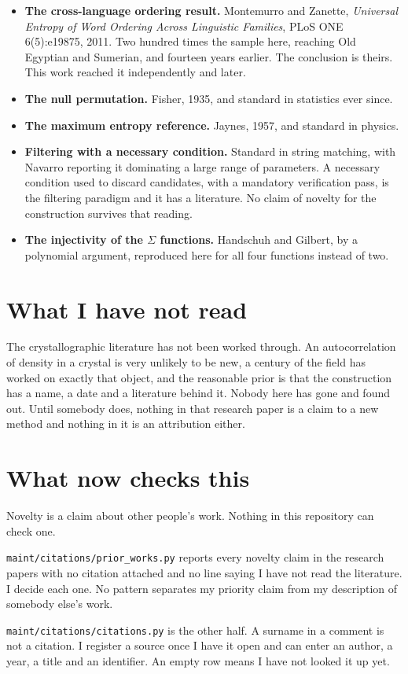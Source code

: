 \begin{itemize}
  \item \textbf{The cross-language ordering result.} Montemurro and Zanette,
    \emph{Universal Entropy of Word Ordering Across Linguistic Families}, PLoS ONE 6(5):e19875, 2011.
    Two hundred times the sample here, reaching Old Egyptian and Sumerian, and fourteen years
    earlier. The conclusion is theirs. This work reached it independently and later.
  \item \textbf{The null permutation.} Fisher, 1935, and standard in statistics ever since.
  \item \textbf{The maximum entropy reference.} Jaynes, 1957, and standard in physics.
  \item \textbf{Filtering with a necessary condition.} Standard in string matching, with Navarro
    reporting it dominating a large range of parameters. A necessary condition used to discard
    candidates, with a mandatory verification pass, is the filtering paradigm and it has a
    literature. No claim of novelty for the construction survives that reading.
  \item \textbf{The injectivity of the $\Sigma$ functions.} Handschuh and Gilbert, by a polynomial
    argument, reproduced here for all four functions instead of two.
\end{itemize}

\section*{What I have not read}

The crystallographic literature has not been worked through. An autocorrelation of density in a
crystal is very unlikely to be new, a century of the field has worked on exactly that object, and
the reasonable prior is that the construction has a name, a date and a literature behind it. Nobody
here has gone and found out. Until somebody does, nothing in that research paper is a claim to a new method
and nothing in it is an attribution either.

\section*{What now checks this}

Novelty is a claim about other people's work. Nothing in this repository can check one.

\texttt{maint/\allowbreak{}citations/\allowbreak{}prior\_\allowbreak{}works.\allowbreak{}py} reports
every novelty claim in the research papers with no citation attached and no line saying I have not read the
literature. I decide each one. No pattern separates my priority claim from my description of
somebody else's work.

\texttt{maint/\allowbreak{}citations/\allowbreak{}citations.\allowbreak{}py} is the other half. A
surname in a comment is not a citation. I register a source once I have it open and can enter an
author, a year, a title and an identifier. An empty row means I have not looked it up yet.
\cleardoublepage
